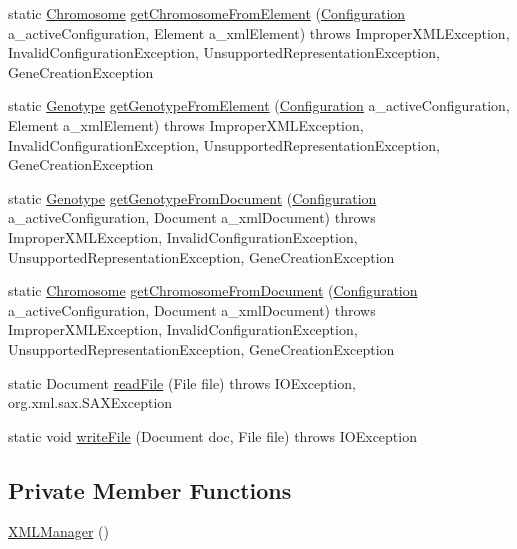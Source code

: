 \begin{DoxyCompactItemize}
\item 
static \hyperlink{classorg_1_1jgap_1_1_chromosome}{Chromosome} \hyperlink{classorg_1_1jgap_1_1xml_1_1_x_m_l_manager_a18c5919588aabeda14a14ef06d4e2102}{get\-Chromosome\-From\-Element} (\hyperlink{classorg_1_1jgap_1_1_configuration}{Configuration} a\-\_\-active\-Configuration, Element a\-\_\-xml\-Element)  throws Improper\-X\-M\-L\-Exception, Invalid\-Configuration\-Exception,       Unsupported\-Representation\-Exception, Gene\-Creation\-Exception 
\item 
static \hyperlink{classorg_1_1jgap_1_1_genotype}{Genotype} \hyperlink{classorg_1_1jgap_1_1xml_1_1_x_m_l_manager_ad53d7d4866abbee606ae8408dbd1a77c}{get\-Genotype\-From\-Element} (\hyperlink{classorg_1_1jgap_1_1_configuration}{Configuration} a\-\_\-active\-Configuration, Element a\-\_\-xml\-Element)  throws Improper\-X\-M\-L\-Exception, Invalid\-Configuration\-Exception,       Unsupported\-Representation\-Exception, Gene\-Creation\-Exception 
\item 
static \hyperlink{classorg_1_1jgap_1_1_genotype}{Genotype} \hyperlink{classorg_1_1jgap_1_1xml_1_1_x_m_l_manager_ad23ed7810596720d5155d695e128baca}{get\-Genotype\-From\-Document} (\hyperlink{classorg_1_1jgap_1_1_configuration}{Configuration} a\-\_\-active\-Configuration, Document a\-\_\-xml\-Document)  throws Improper\-X\-M\-L\-Exception, Invalid\-Configuration\-Exception,       Unsupported\-Representation\-Exception, Gene\-Creation\-Exception 
\item 
static \hyperlink{classorg_1_1jgap_1_1_chromosome}{Chromosome} \hyperlink{classorg_1_1jgap_1_1xml_1_1_x_m_l_manager_a478e6bc1f633080676e5f803fb8b90ea}{get\-Chromosome\-From\-Document} (\hyperlink{classorg_1_1jgap_1_1_configuration}{Configuration} a\-\_\-active\-Configuration, Document a\-\_\-xml\-Document)  throws Improper\-X\-M\-L\-Exception, Invalid\-Configuration\-Exception,       Unsupported\-Representation\-Exception, Gene\-Creation\-Exception 
\item 
static Document \hyperlink{classorg_1_1jgap_1_1xml_1_1_x_m_l_manager_a0ef58d9d7639b0ca569e0d61f25bb50a}{read\-File} (File file)  throws I\-O\-Exception, org.\-xml.\-sax.\-S\-A\-X\-Exception 
\item 
static void \hyperlink{classorg_1_1jgap_1_1xml_1_1_x_m_l_manager_a41c6a2996bc5e4869059ac02d3f80338}{write\-File} (Document doc, File file)  throws I\-O\-Exception 
\end{DoxyCompactItemize}
\subsection*{Private Member Functions}
\begin{DoxyCompactItemize}
\item 
\hyperlink{classorg_1_1jgap_1_1xml_1_1_x_m_l_manager_ab2c65b09d231d520d87edbd9c8624308}{X\-M\-L\-Manager} ()
\end{DoxyCompactItemize}
